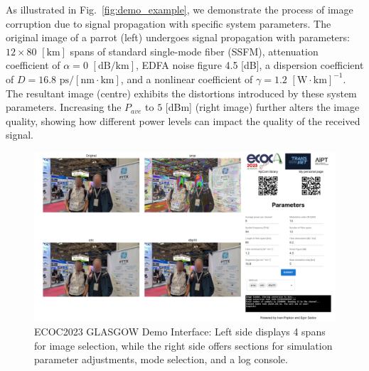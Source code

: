 As illustrated in Fig.~\ref{fig:demo_example}, we demonstrate the process of image corruption due to signal propagation with specific system parameters. The original image of a parrot (left) undergoes signal propagation with parameters: $12 \times 80$ $[\textrm{km}]$ spans of standard single-mode fiber (SSFM), attenuation coefficient of $\alpha = 0$ $[\textrm{dB}/\textrm{km}]$, EDFA noise figure 4.5 \textrm{[dB]}, a dispersion coefficient of $D = 16.8$ $\textrm{ps}/[\textrm{nm} \cdot \textrm{km}]$, and a nonlinear coefficient of $\gamma = 1.2$ $[\textrm{W} \cdot \textrm{km}]^{-1}$. The resultant image (centre) exhibits the distortions introduced by these system parameters. Increasing the $P_{ave}$ to $5$ \textrm{[dBm]} (right image) further alters the image quality, showing how different power levels can impact the quality of the received signal.

\begin{landscape}
\begin{figure}
    \centering
    \includegraphics[width=\linewidth]{images/demo/demo1.png}
    \caption{ECOC2023 GLASGOW Demo Interface: Left side displays 4 spans for image selection, while the right side offers sections for simulation parameter adjustments, mode selection, and a log console.}
    \label{fig:demo1}
\end{figure}
\end{landscape}

